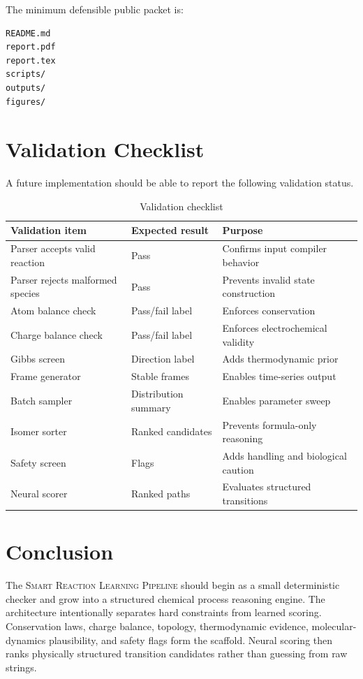 \documentclass[11pt]{article}
\newcommand{\pipeline}{\textsc{Smart Reaction Learning Pipeline}}
\begin{document}
The minimum defensible public packet is:

\begin{lstlisting}
README.md
report.pdf
report.tex
scripts/
outputs/
figures/
\end{lstlisting}

\section{Validation Checklist}

A future implementation should be able to report the following validation status.

\begin{table}[H]
\centering
\caption{Validation checklist}
\begin{tabular}{lll}
\toprule
Validation item & Expected result & Purpose\\
\midrule
Parser accepts valid reaction & Pass & Confirms input compiler behavior\\
Parser rejects malformed species & Pass & Prevents invalid state construction\\
Atom balance check & Pass/fail label & Enforces conservation\\
Charge balance check & Pass/fail label & Enforces electrochemical validity\\
Gibbs screen & Direction label & Adds thermodynamic prior\\
Frame generator & Stable frames & Enables time-series output\\
Batch sampler & Distribution summary & Enables parameter sweep\\
Isomer sorter & Ranked candidates & Prevents formula-only reasoning\\
Safety screen & Flags & Adds handling and biological caution\\
Neural scorer & Ranked paths & Evaluates structured transitions\\
\bottomrule
\end{tabular}
\end{table}

\section{Conclusion}

The \pipeline{} should begin as a small deterministic checker and grow into a structured chemical process reasoning engine. The architecture intentionally separates hard constraints from learned scoring. Conservation laws, charge balance, topology, thermodynamic evidence, molecular-dynamics plausibility, and safety flags form the scaffold. Neural scoring then ranks physically structured transition candidates rather than guessing from raw strings.
\end{document}
